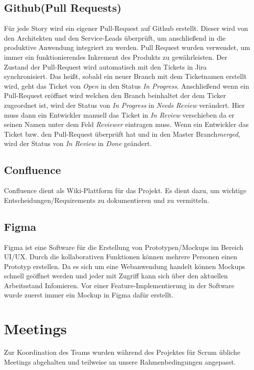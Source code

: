 \subsection{Github(Pull Requests)}
    Für jede Story wird ein eigener Pull-Request auf Github erstellt. Dieser wird von den Architekten und den Service-Leads überprüft, um anschließend in die
    produktive Anwendung integriert zu werden.  Pull Request wurden verwendet, um immer ein funktionierendes Inkrement des Produkts zu gewährleisten.
    Der Zustand der Pull-Request wird automatisch mit den Tickets in Jira synchronisiert. Das heißt, sobald ein neuer Branch mit dem Ticketnamen erstellt wird,
    geht das Ticket von \textit{Open} in den Status \textit{In Progress}. Anschließend wenn ein Pull-Request eröffnet wird welchen den Branch beinhaltet der dem Ticker zugeordnet ist,
    wird der Status von \textit{In Progress} in \textit{Needs Review} verändert. Hier muss dann ein Entwickler manuell das Ticket in \textit{In Review} verschieben da er seinen Namen unter dem Feld \textit{Reviewer}
    eintragen muss. Wenn ein Entwickler das Ticket bzw. den Pull-Request überprüft hat und in den Master Branch\textit{merged}, wird der Status von \textit{In Review} in \textit{Done} geändert.
\subsection{Confluence}
    Confluence dient als Wiki-Plattform für das Projekt. Es dient dazu, um wichtige Entscheidungen/Requirements zu dokumentieren und zu vermitteln.
\subsection{Figma}
    Figma ist eine Software für die Erstellung von Prototypen/Mockups im Bereich UI/UX. Durch die kollaborativen Funktionen können mehrere Personen einen Prototyp erstellen.
    Da es sich um eine Webanwendung handelt können Mockups schnell geöffnet werden und jeder mit Zugriff kann sich über den aktuellen Arbeitsstand Infomieren.
    Vor einer Feature-Implementierung in der Software wurde zuerst immer ein Mockup in Figma dafür erstellt.

\section{Meetings}
Zur Koordination des Teams wurden während des Projektes für Scrum übliche Meetings abgehalten und teilweise an unsere Rahmenbedingungen angepasst.

